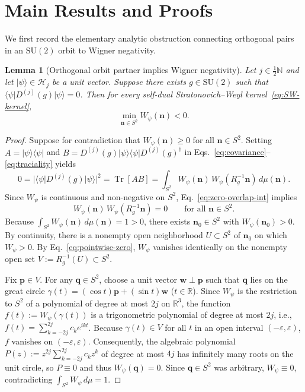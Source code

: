 \documentclass[11pt,a4paper]{article}
\newtheorem{lemma}[theorem]{Lemma}
\theoremstyle{remark}
\newcommand{\ket}[1]{\lvert #1 \rangle}
\newcommand{\bra}[1]{\langle #1 \rvert}
\newcommand{\Tr}{\operatorname{Tr}}
\newcommand{\bn}{\mathbf{n}}
\begin{document}
\section{Main Results and Proofs}

We first record the elementary analytic obstruction connecting orthogonal pairs in an $\mathrm{SU}(2)$ orbit to Wigner negativity.

\begin{lemma}[Orthogonal orbit partner implies Wigner negativity]\label{lem:ortho-neg}
Let $j \in \frac{1}{2}\mathbb{N}$ and let $\ket{\psi} \in \mathcal{H}_j$ be a unit vector. Suppose there exists $g \in \mathrm{SU}(2)$ such that $\bra{\psi} D^{(j)}(g) \ket{\psi} = 0$. Then for every self-dual Stratonovich--Weyl kernel~\eqref{eq:SW-kernel},
\[
\min_{\bn \in S^2} W_\psi(\bn) < 0.
\]
\end{lemma}

\begin{proof}
Suppose for contradiction that $W_\psi(\bn) \ge 0$ for all $\bn \in S^2$. Setting $A = \ket{\psi}\bra{\psi}$ and $B = D^{(j)}(g)\ket{\psi}\bra{\psi}D^{(j)}(g)^\dagger$ in Eqs.~\eqref{eq:covariance}--\eqref{eq:traciality} yields
\begin{equation}\label{eq:zero-overlap-int}
0 = \big|\bra{\psi} D^{(j)}(g) \ket{\psi}\big|^2 = \Tr[AB] = \int_{S^2} W_\psi(\bn)\,W_\psi(R_g^{-1}\bn)\,d\mu(\bn).
\end{equation}
Since $W_\psi$ is continuous and non-negative on $S^2$, Eq.~\eqref{eq:zero-overlap-int} implies
\begin{equation}\label{eq:pointwise-zero}
W_\psi(\bn)\,W_\psi(R_g^{-1}\bn) = 0 \qquad \text{for all } \bn \in S^2.
\end{equation}
Because $\int_{S^2} W_\psi(\bn)\,d\mu(\bn) = 1 > 0$, there exists $\bn_0 \in S^2$ with $W_\psi(\bn_0) > 0$. By continuity, there is a nonempty open neighborhood $U \subset S^2$ of $\bn_0$ on which $W_\psi > 0$. By Eq.~\eqref{eq:pointwise-zero}, $W_\psi$ vanishes identically on the nonempty open set $V := R_g^{-1}(U) \subset S^2$.

Fix $\mathbf{p} \in V$. For any $\mathbf{q} \in S^2$, choose a unit vector $\mathbf{w} \perp \mathbf{p}$ such that $\mathbf{q}$ lies on the great circle $\gamma(t) = (\cos t)\mathbf{p} + (\sin t)\mathbf{w}$ ($t \in \mathbb{R}$). Since $W_\psi$ is the restriction to $S^2$ of a polynomial of degree at most $2j$ on $\mathbb{R}^3$, the function $f(t) := W_\psi(\gamma(t))$ is a trigonometric polynomial of degree at most $2j$, i.e., $f(t) = \sum_{k=-2j}^{2j} c_k e^{ikt}$. Because $\gamma(t) \in V$ for all $t$ in an open interval $(-\varepsilon, \varepsilon)$, $f$ vanishes on $(-\varepsilon, \varepsilon)$. Consequently, the algebraic polynomial $P(z) := z^{2j} \sum_{k=-2j}^{2j} c_k z^k$ of degree at most $4j$ has infinitely many roots on the unit circle, so $P \equiv 0$ and thus $W_\psi(\mathbf{q}) = 0$. Since $\mathbf{q} \in S^2$ was arbitrary, $W_\psi \equiv 0$, contradicting $\int_{S^2} W_\psi\,d\mu = 1$.
\end{proof}
\end{document}
